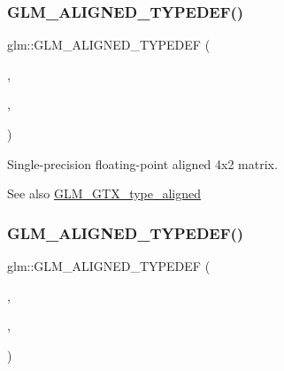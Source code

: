 \subsubsection{\texorpdfstring{G\+L\+M\+\_\+\+A\+L\+I\+G\+N\+E\+D\+\_\+\+T\+Y\+P\+E\+D\+E\+F()}{GLM\_ALIGNED\_TYPEDEF()}\hspace{0.1cm}{\footnotesize\ttfamily [190/209]}}
{\footnotesize\ttfamily glm\+::\+G\+L\+M\+\_\+\+A\+L\+I\+G\+N\+E\+D\+\_\+\+T\+Y\+P\+E\+D\+EF (\begin{DoxyParamCaption}\item[{\hyperlink{group__gtc__type__precision_gab531a3d0479121732ae090254e0bd58f}{f32mat4x2}}]{,  }\item[{aligned\+\_\+f32mat4x2}]{,  }\item[{16}]{ }\end{DoxyParamCaption})}

Single-\/precision floating-\/point aligned 4x2 matrix. \begin{DoxySeeAlso}{See also}
\hyperlink{group__gtx__type__aligned}{G\+L\+M\+\_\+\+G\+T\+X\+\_\+type\+\_\+aligned} 
\end{DoxySeeAlso}
\mbox{\label{group__gtx__type__aligned_ga9476ef66790239df53dbe66f3989c3b5}} 
\subsubsection{\texorpdfstring{G\+L\+M\+\_\+\+A\+L\+I\+G\+N\+E\+D\+\_\+\+T\+Y\+P\+E\+D\+E\+F()}{GLM\_ALIGNED\_TYPEDEF()}\hspace{0.1cm}{\footnotesize\ttfamily [191/209]}}
{\footnotesize\ttfamily glm\+::\+G\+L\+M\+\_\+\+A\+L\+I\+G\+N\+E\+D\+\_\+\+T\+Y\+P\+E\+D\+EF (\begin{DoxyParamCaption}\item[{\hyperlink{group__gtc__type__precision_gad68d998fa74028e02bfadd4778bd549a}{f32mat4x3}}]{,  }\item[{aligned\+\_\+f32mat4x3}]{,  }\item[{16}]{ }\end{DoxyParamCaption})}

